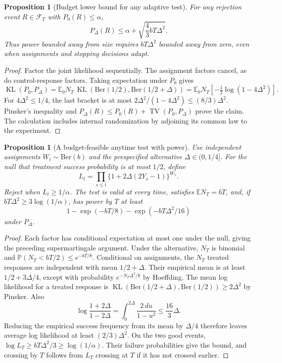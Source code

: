 \documentclass[11pt,a4paper]{article}
\newtheorem{proposition}[theorem]{Proposition}
\newcommand{\E}{\mathbb E}
\newcommand{\Prb}{\mathbb P}
\newcommand{\TV}{\operatorname{TV}}
\newcommand{\KL}{\operatorname{KL}}
\begin{document}
\begin{proposition}[Budget lower bound for any adaptive test]
For any rejection event $R\in\mathcal F_T$ with $P_0(R)\leq\alpha$,
\[
 P_\Delta(R)\leq\alpha+\sqrt{\frac43 bT\Delta^2}.
\]
Thus power bounded away from size requires $bT\Delta^2$ bounded away from zero, even when assignments and stopping decisions adapt.
\end{proposition}
\begin{proof}
Factor the joint likelihood sequentially. The assignment factors cancel, as do control-response factors. Taking expectation under $P_0$ gives
\[
 \KL(P_0,P_\Delta)=\E_0N_T\,
 \KL(\mathrm{Ber}(1/2),\mathrm{Ber}(1/2+\Delta))
 =\E_0N_T[-\tfrac12\log(1-4\Delta^2)].
\]
For $4\Delta^2\leq1/4$, the last bracket is at most
$2\Delta^2/(1-4\Delta^2)\leq(8/3)\Delta^2$.
Pinsker's inequality and $P_\Delta(R)\leq P_0(R)+\TV(P_0,P_\Delta)$ prove the claim. The calculation includes internal randomization by adjoining its common law to the experiment.
\end{proof}

\begin{proposition}[A budget-feasible anytime test with power]
Use independent assignments $W_t\sim\mathrm{Ber}(b)$ and the prespecified alternative $\Delta\in(0,1/4]$. For the null that treatment success probability is at most $1/2$, define
\[
 L_t=\prod_{s\leq t}\{1+2\Delta(2Y_s-1)\}^{W_s}.
\]
Reject when $L_t\geq1/\alpha$. The test is valid at every time, satisfies $\E N_T=bT$, and, if $bT\Delta^2\geq3\log(1/\alpha)$, has power by $T$ at least
\[
 1-\exp(-bT/8)-\exp(-bT\Delta^2/16)
\]
under $P_\Delta$.
\end{proposition}
\begin{proof}
Each factor has conditional expectation at most one under the null, giving the preceding supermartingale argument. Under the alternative, $N_T$ is binomial and $\Prb(N_T<bT/2)\leq e^{-bT/8}$. Conditional on assignments, the $N_T$ treated responses are independent with mean $1/2+\Delta$. Their empirical mean is at least $1/2+3\Delta/4$, except with probability $e^{-N_T\Delta^2/8}$ by Hoeffding.
The mean log likelihood for a treated response is
$\KL(\mathrm{Ber}(1/2+\Delta),\mathrm{Ber}(1/2))\geq2\Delta^2$ by Pinsker. Also
\[
 \log\frac{1+2\Delta}{1-2\Delta}
 =\int_0^{2\Delta}\frac{2\,du}{1-u^2}\leq\frac{16}{3}\Delta.
\]
Reducing the empirical success frequency from its mean by $\Delta/4$ therefore leaves average log likelihood at least $(2/3)\Delta^2$. On the two good events, $\log L_T\geq bT\Delta^2/3\geq\log(1/\alpha)$. Their failure probabilities give the bound, and crossing by $T$ follows from $L_T$ crossing at $T$ if it has not crossed earlier.
\end{proof}
\end{document}
